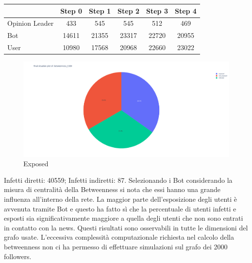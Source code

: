         \begin{table}[H]
            \centering
            \begin{tabular}{|l|c|c|c|c|c|}
            \hline
                           & Step 0 & Step 1 & Step 2 & Step 3 & Step 4 \\ \hline
            Opinion Leader & 433    & 545    & 545    & 512    & 469    \\ \hline
            Bot            & 14611  & 21355  & 23317  & 22720  & 20955  \\ \hline
            User           & 10980  & 17568  & 20968  & 22660  & 23022  \\ \hline
            \end{tabular}
        \end{table}
        
        \begin{figure}[H]
            \includegraphics[width=16cm]{resources/charts/btw_1500_pie.png}
            \caption{Exposed}
            \label{fig:btw_1500_pie}
        \end{figure}
        Infetti diretti: 40559;\newline
        Infetti indiretti: 87.
        \newline
        \newline
        Selezionando i Bot considerando la misura di centralità della Betweenness si nota che essi hanno una grande influenza all’interno della rete. La maggior parte dell’esposizione degli utenti è avvenuta tramite Bot e questo ha fatto sì che la percentuale di utenti infetti e esposti sia significativamente maggiore a quella degli utenti che non sono entrati in contatto con la news.
       \newline
        Questi risultati sono osservabili in tutte le dimensioni del grafo usate. L’eccessiva complessità computazionale richiesta nel calcolo della betweenness non ci ha permesso di effettuare simulazioni sul grafo dei 2000 followers.

